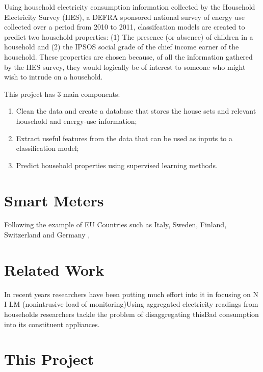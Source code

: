 Using household electricity consumption information collected by the Household Electricity Survey (HES), a DEFRA sponsored national survey of energy use collected over a period from 2010 to 2011, classifcation models are created to predict two household properties: (1) The presence (or absence) of children in a household and (2) the IPSOS social grade of the chief income earner of the household. These properties are chosen because, of all the information gathered by the HES survey, they would logically be of interest to someone who might wish to intrude on a household.
\newline

This project has 3 main components:

\begin{enumerate}
\item Clean the data and create a database that stores the house sets and relevant household and energy-use information;
\item Extract useful features from the data that can be used as inputs to a classification model; 
\item Predict household properties using supervised learning methods.
\end{enumerate}
\section{Smart Meters}
Following the example of EU Countries such as Italy, Sweden, Finland, Switzerland and Germany \cite{OfGEM}\cite{Vasc}, 
\section{Related Work}
In recent years researchers have been putting much effort into it in focusing on N I LM (nonintrusive load of monitoring)Using aggregated electricity readings from households researchers tackle the problem of disaggregating thisBad consumption into its constituent appliances.

\section{This Project}
